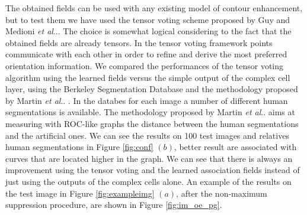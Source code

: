 \documentclass{llncs}
\makeatletter
\DeclareRobustCommand\onedot{\futurelet\@let@token\@onedot}
\def\@onedot{\ifx\@let@token.\else.\null\fi\xspace}
\def\etal{\emph{et al}\onedot}
\makeatother
\begin{document}
The obtained fields can be used with any existing model of contour enhancement,
but to test them we have used the tensor voting scheme proposed by
Guy and Medioni \etal \cite{Guy96}. The choice is somewhat logical considering
to the fact that the obtained fields are already tensors. In the tensor voting
framework points communicate with each other in order to refine and derive the
most preferred orientation information.
We compared the performances of the tensor voting algorithm using the learned
fields versus the simple output of the complex cell layer, using the Berkeley
Segmentation Database and the methodology proposed by Martin \etal
\cite{MartinFM04,MartinFTM01}. In the databes for each image a number of
different human segmentations is available. The methodology proposed by Martin \etal
aims at measuring with ROC-like graphs the distance between the human segmentations
and the artificial ones. We can see the results on 100 test images and
relatives human segmentations in Figure
\ref{fig:conf} $(b)$, better result are associated with curves that are located higher in the graph.
We can see that there is always an improvement using the tensor voting and
the learned association fields instead of just using the outputs of
the complex cells alone. An example of the results on the test image in Figure
\ref{fig:exampleimg} $(a)$, after the non-maximum suppression procedure, are
shown in Figure \ref{fig:im_oe_pg}.
\end{document}
